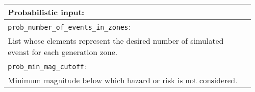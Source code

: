 \vspace{2em}
\begin{tabular}{|p{\textwidth}|}
\hline
\vspace{0.3em} \noindent \Large \textbf{Probabilistic input:} \normalsize \\
\hline \vspace{0.1em} \texttt{prob\_number\_of\_events\_in\_zones}: \\
 List whose elements represent the
desired number of simulated evenst for each generation zone.\\
\hline
\vspace{0.1em} \texttt{prob\_min\_mag\_cutoff}: \\
Minimum magnitude below which hazard or risk is not considered.     \\
\hline
 \end{tabular}

